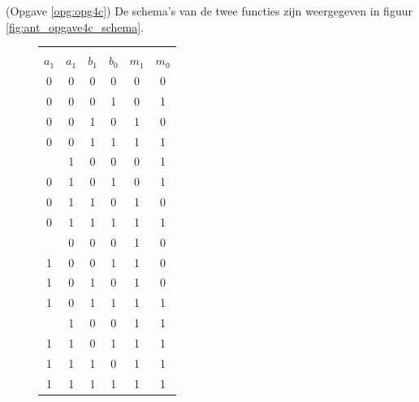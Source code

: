 \documentclass[a4paper,12pt,addpoints,fleqn,dutch,concept]{tisdexam}
\begin{document}
\begin{questions}
(Opgave \ref{opg:opg4c}) De schema's van de twee functies zijn weergegeven
in figuur \ref{fig:ant_opgave4c_schema}.

\begin{figure}[H]
  \begin{minipage}[c]{.30\linewidth}
    \label{tab:ant_opgave4a}
    \begin{tabular}{ c c c c | c  c }
      \hline
              &         &         &         &         &         \\ [-2.9ex]
      $a_{1}$ & $a_{1}$ & $b_{1}$ & $b_{0}$ & $m_{1}$ & $m_{0}$ \\ \hline
         0    &    0    &    0    &    0    &    0    &    0   \\
         0    &    0    &    0    &    1    &    0    &    1   \\
         0    &    0    &    1    &    0    &    1    &    0   \\
         0    &    0    &    1    &    1    &    1    &    1   \\ \hdashline
         0    &    1    &    0    &    0    &    0    &    1   \\
         0    &    1    &    0    &    1    &    0    &    1   \\
         0    &    1    &    1    &    0    &    1    &    0   \\ 
         0    &    1    &    1    &    1    &    1    &    1   \\ \hdashline
         1    &    0    &    0    &    0    &    1    &    0   \\
         1    &    0    &    0    &    1    &    1    &    0   \\
         1    &    0    &    1    &    0    &    1    &    0   \\
         1    &    0    &    1    &    1    &    1    &    1   \\ \hdashline
         1    &    1    &    0    &    0    &    1    &    1   \\
         1    &    1    &    0    &    1    &    1    &    1   \\
         1    &    1    &    1    &    0    &    1    &    1   \\ 
         1    &    1    &    1    &    1    &    1    &    1   \\ \hline
    \end{tabular}
    \vskip10pt
  \end{minipage}\hfill
  \begin{minipage}[c]{0.65\linewidth}

\end{minipage}
\end{figure}
\end{questions}
\end{document}
